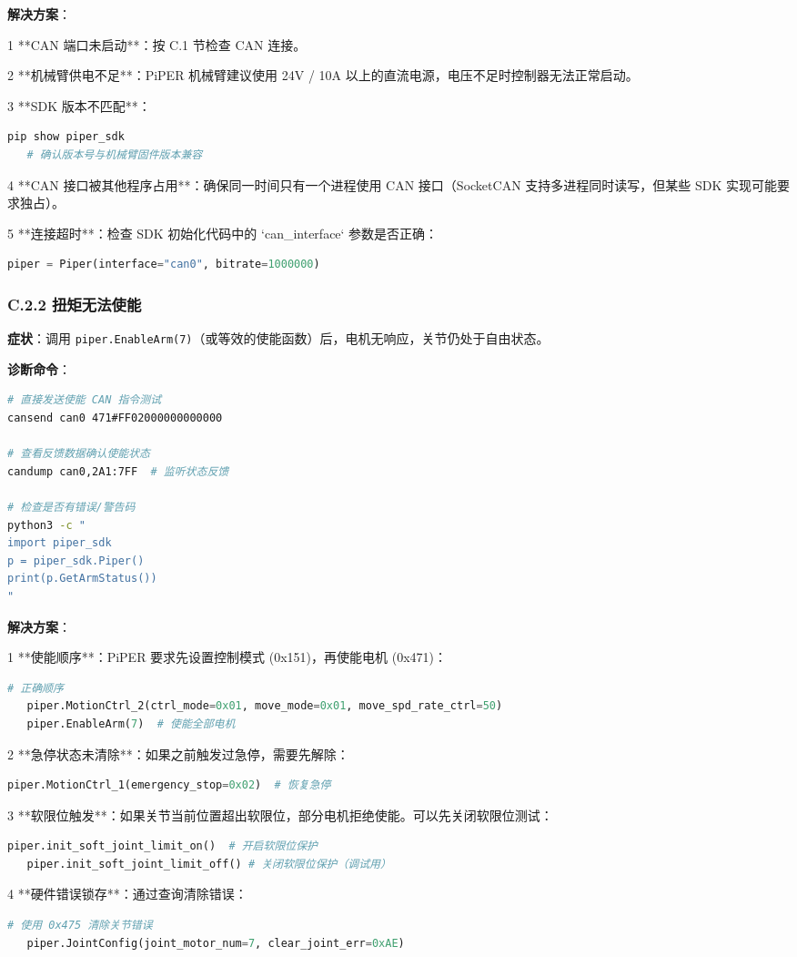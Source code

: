 \documentclass[UTF8,a4paper,11pt]{ctexart}
\begin{document}
{\textbf{解决方案}：
\item[1] **CAN 端口未启动**：按 C.1 节检查 CAN 连接。
\item[2] **机械臂供电不足**：PiPER 机械臂建议使用 24V / 10A 以上的直流电源，电压不足时控制器无法正常启动。
\item[3] **SDK 版本不匹配**：
\begin{lstlisting}[language=bash]
   pip show piper_sdk
   # 确认版本号与机械臂固件版本兼容
\end{lstlisting}
\item[4] **CAN 接口被其他程序占用**：确保同一时间只有一个进程使用 CAN 接口（SocketCAN 支持多进程同时读写，但某些 SDK 实现可能要求独占）。
\item[5] **连接超时**：检查 SDK 初始化代码中的 `can_interface` 参数是否正确：
\begin{lstlisting}[language=python]
   piper = Piper(interface="can0", bitrate=1000000)
\end{lstlisting}

\subsubsection{C.2.2 扭矩无法使能}

\textbf{症状}：调用 \texttt{piper.EnableArm(7)}（或等效的使能函数）后，电机无响应，关节仍处于自由状态。

\textbf{诊断命令}：
\begin{lstlisting}[language=bash]
# 直接发送使能 CAN 指令测试
cansend can0 471#FF02000000000000

# 查看反馈数据确认使能状态
candump can0,2A1:7FF  # 监听状态反馈

# 检查是否有错误/警告码
python3 -c "
import piper_sdk
p = piper_sdk.Piper()
print(p.GetArmStatus())
"
\end{lstlisting}

\textbf{解决方案}：
\item[1] **使能顺序**：PiPER 要求先设置控制模式 (0x151)，再使能电机 (0x471)：
\begin{lstlisting}[language=python]
   # 正确顺序
   piper.MotionCtrl_2(ctrl_mode=0x01, move_mode=0x01, move_spd_rate_ctrl=50)
   piper.EnableArm(7)  # 使能全部电机
\end{lstlisting}
\item[2] **急停状态未清除**：如果之前触发过急停，需要先解除：
\begin{lstlisting}[language=python]
   piper.MotionCtrl_1(emergency_stop=0x02)  # 恢复急停
\end{lstlisting}
\item[3] **软限位触发**：如果关节当前位置超出软限位，部分电机拒绝使能。可以先关闭软限位测试：
\begin{lstlisting}[language=python]
   piper.init_soft_joint_limit_on()  # 开启软限位保护
   piper.init_soft_joint_limit_off() # 关闭软限位保护（调试用）
\end{lstlisting}
\item[4] **硬件错误锁存**：通过查询清除错误：
\begin{lstlisting}[language=python]
   # 使用 0x475 清除关节错误
   piper.JointConfig(joint_motor_num=7, clear_joint_err=0xAE)
\end{lstlisting}

}
\end{document}
